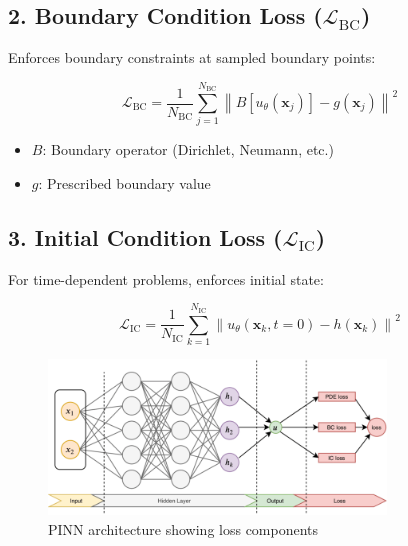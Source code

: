 \documentclass[12pt]{article}
\begin{document}
\subsection*{2. Boundary Condition Loss ($\mathcal{L}_{\text{BC}}$)}
Enforces boundary constraints at sampled boundary points:

\begin{equation}
\mathcal{L}_{\text{BC}} = \frac{1}{N_{\text{BC}}} \sum_{j=1}^{N_{\text{BC}}} \left\| B[u_{\theta}(\mathbf{x}_j)] - g(\mathbf{x}_j) \right\|^2
\end{equation}

\begin{itemize}
    \item $B$: Boundary operator (Dirichlet, Neumann, etc.)
    \item $g$: Prescribed boundary value
\end{itemize}

\subsection*{3. Initial Condition Loss ($\mathcal{L}_{\text{IC}}$)}
For time-dependent problems, enforces initial state:

\begin{equation}
\mathcal{L}_{\text{IC}} = \frac{1}{N_{\text{IC}}} \sum_{k=1}^{N_{\text{IC}}} \left\| u_{\theta}(\mathbf{x}_k, t=0) - h(\mathbf{x}_k) \right\|^2
\end{equation}

\begin{figure}[h]
    \centering
    \includegraphics[width=0.8\textwidth]{fig.png}
    \caption{PINN architecture showing loss components}
    \label{fig:pinn}
\end{figure}
\end{document}
